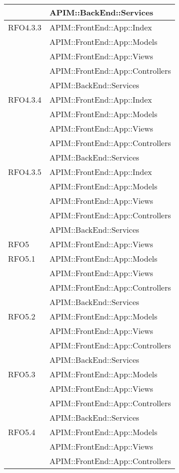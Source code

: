 \begin{longtable}{ p{4cm} | p{12cm} }
			& APIM::BackEnd::Services \\
			\hline
			RFO4.3.3
			& APIM::FrontEnd::App::Index \\
			& APIM::FrontEnd::App::Models \\
			& APIM::FrontEnd::App::Views \\
			& APIM::FrontEnd::App::Controllers \\
			& APIM::BackEnd::Services \\
			\hline		
			RFO4.3.4
			& APIM::FrontEnd::App::Index \\
			& APIM::FrontEnd::App::Models \\
			& APIM::FrontEnd::App::Views \\
			& APIM::FrontEnd::App::Controllers \\
			& APIM::BackEnd::Services \\
			\hline		
			RFO4.3.5
			& APIM::FrontEnd::App::Index \\
			& APIM::FrontEnd::App::Models \\
			& APIM::FrontEnd::App::Views \\
			& APIM::FrontEnd::App::Controllers \\
			& APIM::BackEnd::Services \\
			\hline		
			RFO5
			& APIM::FrontEnd::App::Views \\
			\hline		
			RFO5.1
			& APIM::FrontEnd::App::Models \\
			& APIM::FrontEnd::App::Views \\
			& APIM::FrontEnd::App::Controllers \\
			& APIM::BackEnd::Services \\
			\hline		
			RFO5.2
			& APIM::FrontEnd::App::Models \\
			& APIM::FrontEnd::App::Views \\
			& APIM::FrontEnd::App::Controllers \\
			& APIM::BackEnd::Services \\
			\hline		
			RFO5.3
			& APIM::FrontEnd::App::Models \\
			& APIM::FrontEnd::App::Views \\
			& APIM::FrontEnd::App::Controllers \\
			& APIM::BackEnd::Services \\
			\hline		
			RFO5.4
			& APIM::FrontEnd::App::Models \\
			& APIM::FrontEnd::App::Views \\
			& APIM::FrontEnd::App::Controllers \\

\end{longtable}
